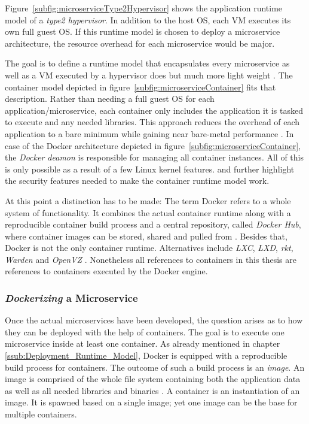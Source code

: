 Figure~\ref{subfig:microserviceType2Hypervisor} shows the application runtime
model of a \textit{type2 hypervisor}. In addition to the host \ac{OS}, each
\ac{VM} executes its own full guest \ac{OS}. If this runtime model is chosen to
deploy a microservice architecture, the resource overhead for each microservice
would be major.

The goal is to define a runtime model that encapsulates every microservice as
well as a \ac{VM} executed by a hypervisor does but much more light weight
\autocite{SchenkerLearnDockerFundamentals2018}. The container model depicted in
figure~\ref{subfig:microserviceContainer} fits that description. Rather than
needing a full guest \ac{OS} for each application/microservice, each
container only includes the application it is tasked to execute and any needed
libraries. This approach reduces the overhead of each application to a bare
minimum while gaining near bare-metal performance \autocite[Ch.
1A]{CombeDockerNotDocker2016}. In case of the Docker architecture depicted in
figure~\ref{subfig:microserviceContainer}, the \textit{Docker deamon} is
responsible for managing all container instances. All of this is only possible
as a result of a few Linux kernel features. \autocite{CombeDockerNotDocker2016}
and \autocite[Ch. 1.2.1]{LuksaKubernetesAction2017} further highlight the
security features needed to make the container runtime model work.

At this point a distinction has to be made: The term Docker refers to a whole
system of functionality. It combines the actual container runtime along with a
reproducible container build process and a central repository, called
\textit{Docker Hub}, where container images can be stored, shared and pulled
from \autocite[Ch. 1B]{CombeDockerNotDocker2016}. Besides that, Docker is not
the only container runtime. Alternatives include \textit{LXC}, \textit{LXD},
\textit{rkt}, \textit{Warden} and \textit{OpenVZ} \autocite[Tab.
1]{CombeDockerNotDocker2016}. Nonetheless all references to containers in this
thesis are references to containers executed by the Docker engine.

\subsubsection{\textit{Dockerizing} a Microservice}%
\label{ssub:Dockerizing_a_Microservice}

Once the actual microservices have been developed, the question arises as to
how they can be deployed with the help of containers. The goal is to execute
one microservice inside at least one container. As already mentioned in chapter
\ref{ssub:Deployment_Runtime_Model}, Docker is equipped with a reproducible
build process for containers. The outcome of such a build process is an
\textit{image}. An image is comprised of the whole file system containing both the
application data as well as all needed libraries and binaries \autocite[Ch.
1]{LuksaKubernetesAction2017}. A container is an instantiation of an image. It
is spawned based on a single image; yet one image can be the base for multiple
containers.

